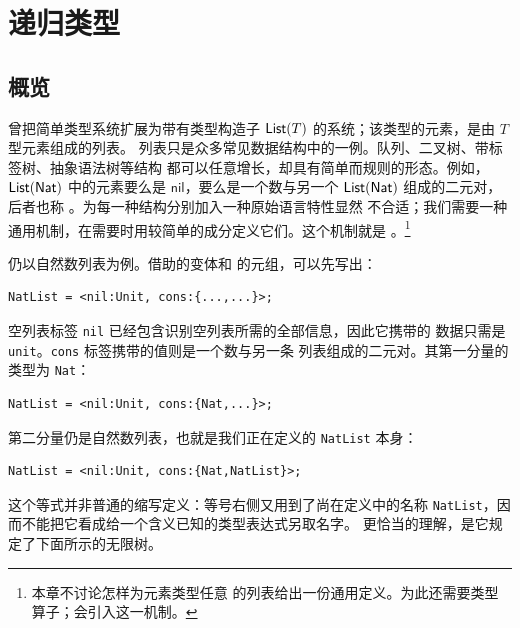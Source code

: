 
\chapter{递归类型}
\label{chap:20}

\section*{概览}

曾把简单类型系统扩展为带有类型构造子
\(\mathsf{List}(T)\) 的系统；该类型的元素，是由 \(T\) 型元素组成的列表。
列表只是众多常见数据结构中的一例。队列、二叉树、带标签树、抽象语法树等结构
都可以任意增长，却具有简单而规则的形态。例如，\(\mathsf{List}(\mathsf{Nat})\)
中的元素要么是 \(\mathsf{nil}\)，要么是一个数与另一个
\(\mathsf{List}(\mathsf{Nat})\) 组成的二元对，后者也称
。为每一种结构分别加入一种原始语言特性显然
不合适；我们需要一种通用机制，在需要时用较简单的成分定义它们。这个机制就是
。\footnote{本章不讨论怎样为元素类型任意
的列表给出一份通用定义。为此还需要类型算子；会引入这一机制。}

仍以自然数列表为例。借助的变体和
的元组，可以先写出：
\begin{lstlisting}
NatList = <nil:Unit, cons:{...,...}>;
\end{lstlisting}
空列表标签 \texttt{nil} 已经包含识别空列表所需的全部信息，因此它携带的
数据只需是 \texttt{unit}。\texttt{cons} 标签携带的值则是一个数与另一条
列表组成的二元对。其第一分量的类型为 \texttt{Nat}：
\begin{lstlisting}
NatList = <nil:Unit, cons:{Nat,...}>;
\end{lstlisting}
第二分量仍是自然数列表，也就是我们正在定义的 \texttt{NatList} 本身：
\begin{lstlisting}
NatList = <nil:Unit, cons:{Nat,NatList}>;
\end{lstlisting}

这个等式并非普通的缩写定义：等号右侧又用到了尚在定义中的名称
\texttt{NatList}，因而不能把它看成给一个含义已知的类型表达式另取名字。
更恰当的理解，是它规定了下面所示的无限树。

